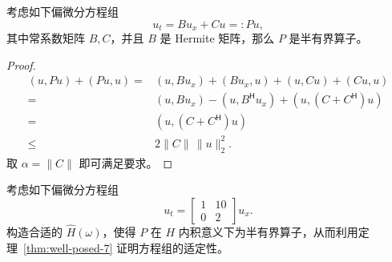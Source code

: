 \begin{example}
    考虑如下偏微分方程组
    \[
        u_t = B u_x + C u =: P u,
    \]
    其中常系数矩阵 $B,C$，并且 $B$ 是 Hermite 矩阵，那么 $P$ 是半有界算子。
\end{example}

\begin{proof}
    \begin{align*}
        (u, P u) + (P u, u) ={} & (u, B u_x) + (B u_x, u) + (u, C u) + (C u, u)                  \\
        ={}                     & (u, B u_x) -(u, B^{\mathsf{H}} u_x) + (u, (C+C^{\mathsf{H}})u) \\
        ={}                     & (u, (C+C^{\mathsf{H}})u)                                       \\
        \le                     & 2 \| C \| \, \|u\|_2^2.
    \end{align*}
    取 $\alpha = \| C \|$ 即可满足要求。
\end{proof}

\begin{example}
    考虑如下偏微分方程组
    \[
        u_t=
        \begin{bmatrix}
            1 & 10 \\
            0 & 2
        \end{bmatrix} u_x.
    \]
    构造合适的 $\widehat{H}(\omega)$，使得 $P$ 在 $H$ 内积意义下为半有界算子，从而利用定理~\ref{thm:well-posed-7} 证明方程组的适定性。
\end{example}

